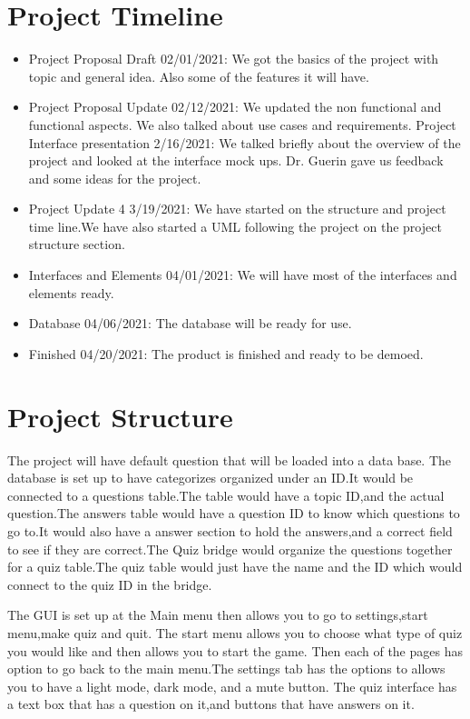 \documentclass[10pt,conference,onecolumn,compsoc]{IEEEtran}
\begin{document}
\section{Project Timeline}
\begin{itemize}
\item Project Proposal Draft 02/01/2021: We got the basics of the project with topic and general idea. Also some of the features it will have.
\item Project Proposal Update 02/12/2021: We updated the non functional and functional aspects. We also talked about use cases and requirements.
Project Interface presentation 2/16/2021: We talked  briefly  about the overview of the project and looked at the interface mock ups. Dr. Guerin gave us feedback and some ideas for the project.
\item Project Update 4 3/19/2021: We have started on the structure and project time line.We have also started a UML following the project on the project structure section.
\item Interfaces and Elements 04/01/2021: We will have most of the interfaces and elements ready.
\item Database 04/06/2021: The database will be ready for use.
\item Finished 04/20/2021: The product is finished and ready to be demoed.
\end{itemize}
 
\section{Project Structure}
 	The project will have default question that will be loaded into a data base.
The database is set up to have categorizes organized under an ID.It would be connected to a questions table.The table would have a topic ID,and the actual question.The answers table would have a question ID to know which questions to go to.It would also have a answer section to hold the answers,and a correct field to see if they are correct.The Quiz bridge would organize the questions together for a quiz table.The quiz table would just have the name and the ID which would connect to the quiz ID in the bridge.

 	The GUI is set up at the Main menu  then allows you to go to settings,start menu,make quiz and quit. The start menu allows you to choose what type of quiz you would like and then allows you to start the game. Then each of the pages has option to go back to the main menu.The settings tab has the options to allows you to have a light mode, dark mode, and a mute button. The quiz interface has a text box that has a question on it,and buttons that have answers on it.
\end{document}
